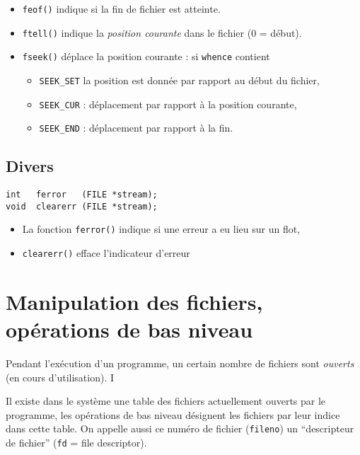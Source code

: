 \begin{itemize}
  \item 
\texttt{feof()} indique si la fin de fichier est atteinte.
\item \texttt{ftell()} indique la \emph{position courante} dans le fichier
  (0 = début).
  \item \texttt{fseek()} déplace la position courante : si
    \texttt{whence} contient
    \begin{itemize}
      \item \texttt{SEEK\_SET} la position est donnée par
        rapport au début du fichier,
        \item \texttt{SEEK\_CUR} : déplacement
          par rapport à la position courante,
          \item \texttt{SEEK\_END} : déplacement
            par rapport à la fin.
    \end{itemize}
\end{itemize}



\subsection{Divers}

\extrait
\begin{lstlisting}
int   ferror   (FILE *stream);
void  clearerr (FILE *stream);
\end{lstlisting}


\begin{itemize}
\item La fonction \texttt{ferror()} indique si une erreur a eu lieu
  sur un flot,
  \item
    \texttt{clearerr()} efface l'indicateur d'erreur
\end{itemize}


\section{Manipulation des fichiers, opérations de bas niveau}

Pendant l'exécution d'un programme, un certain nombre de fichiers sont
\emph{ouverts} (en cours d'utilisation).  I

Il existe dans le système
une table des fichiers actuellement ouverts par le programme,
les opérations de bas niveau désignent les fichiers par leur indice
dans cette table. On appelle aussi  ce numéro de fichier (\texttt{fileno})
un ``descripteur de fichier'' (\texttt{fd} = file descriptor).

